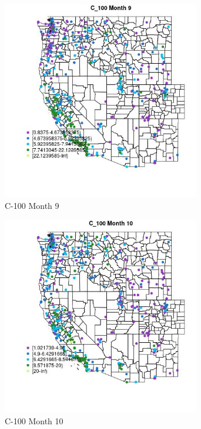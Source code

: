 \begin{figure} 
\centering  
\includegraphics[width=0.77\textwidth]{Code_Outputs/ML_input_report_ML_input_PM25_Step5_part_d_de_duplicated_aves_ML_input_MapObsMo9C_100.jpg} 
\caption{\label{fig:ML_input_report_ML_input_PM25_Step5_part_d_de_duplicated_aves_ML_inputMapObsMo9C_100}C-100 Month 9} 
\end{figure} 
 

\begin{figure} 
\centering  
\includegraphics[width=0.77\textwidth]{Code_Outputs/ML_input_report_ML_input_PM25_Step5_part_d_de_duplicated_aves_ML_input_MapObsMo10C_100.jpg} 
\caption{\label{fig:ML_input_report_ML_input_PM25_Step5_part_d_de_duplicated_aves_ML_inputMapObsMo10C_100}C-100 Month 10} 
\end{figure} 
 

